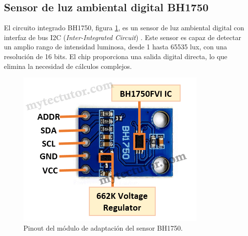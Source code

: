 

\subsection{Sensor de luz ambiental digital BH1750}

El circuito integrado BH1750, figura \ref{fig:BH1750}, es un sensor de luz ambiental digital con interfaz de bus I2C (\textit{Inter-Integrated Circuit}) \cite{BH1750}. Este sensor es capaz de detectar un amplio rango de intensidad luminosa, desde 1 hasta 65535 lux, con una resolución de 16 bits. El chip proporciona una salida digital directa, lo que elimina la necesidad de cálculos complejos.



\begin{figure}[h]
\centering
\includegraphics[scale=.5]{./Figures/BH1750.png}
	\caption{Pinout del módulo de adaptación del sensor BH1750\protect\footnotemark.}
	\label{fig:BH1750}
\end{figure}


